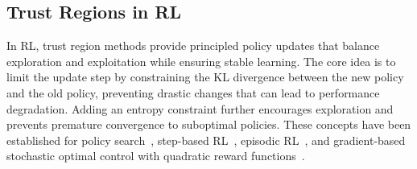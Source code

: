 \subsection{Trust Regions in \ac*{RL}}
In \ac{RL}, trust region methods provide principled policy updates that balance exploration and exploitation while ensuring stable learning.
The core idea is to limit the update step by constraining the \ac{KL} divergence between the new policy and the old policy, preventing drastic changes that can lead to performance degradation.
Adding an entropy constraint further encourages exploration and prevents premature convergence to suboptimal policies.
These concepts have been established for policy search~\cite{petersRelativeEntropyPolicy2010,abdolmaleki2015model}, step-based \ac{RL}~\cite{schulmanTrustRegionPolicy2015}, episodic \ac{RL}~\cite{ottoDeepBlackboxReinforcement2023}, and gradient-based stochastic optimal control with quadratic reward functions~\cite{blessingTrustRegionConstrained2025}.